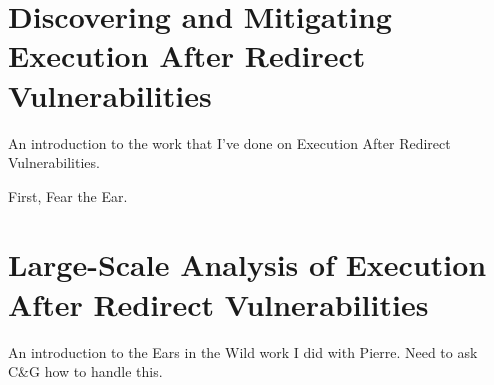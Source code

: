 \chapter{Discovering and Mitigating Execution After Redirect Vulnerabilities}
\label{fear-the-ear}

An introduction to the work that I've done on Execution After Redirect Vulnerabilities.

First, Fear the Ear.



\chapter{Large-Scale Analysis of Execution After Redirect Vulnerabilities}
\label{ears-in-the-wild}
An introduction to the Ears in the Wild work I did with Pierre. Need
to ask C\&G how to handle this.


